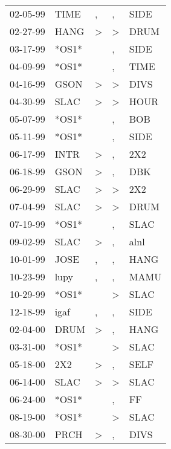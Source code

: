 \begin{supertabular}{lllll}
 02-05-99 &   TIME &                , &             , &   SIDE \\
 02-27-99 &   HANG &     \textgreater &  \textgreater &   DRUM \\
 03-17-99 &  *OS1* &                  &             , &   SIDE \\
 04-09-99 &  *OS1* &                  &             , &   TIME \\
 04-16-99 &   GSON &     \textgreater &  \textgreater &   DIVS \\
 04-30-99 &   SLAC &     \textgreater &  \textgreater &   HOUR \\
 05-07-99 &  *OS1* &                  &             , &    BOB \\
 05-11-99 &  *OS1* &                  &             , &   SIDE \\
 06-17-99 &   INTR &     \textgreater &             , &    2X2 \\
 06-18-99 &   GSON &     \textgreater &             , &    DBK \\
 06-29-99 &   SLAC &     \textgreater &  \textgreater &    2X2 \\
 07-04-99 &   SLAC &     \textgreater &  \textgreater &   DRUM \\
 07-19-99 &  *OS1* &                  &             , &   SLAC \\
 09-02-99 &   SLAC &     \textgreater &             , &   alnl \\
 10-01-99 &   JOSE &                , &             , &   HANG \\
 10-23-99 &   lupy &                , &             , &   MAMU \\
 10-29-99 &  *OS1* &                  &  \textgreater &   SLAC \\
 12-18-99 &   igaf &                , &             , &   SIDE \\
 02-04-00 &   DRUM &     \textgreater &             , &   HANG \\
 03-31-00 &  *OS1* &                  &  \textgreater &   SLAC \\
 05-18-00 &    2X2 &     \textgreater &             , &   SELF \\
 06-14-00 &   SLAC &     \textgreater &  \textgreater &   SLAC \\
 06-24-00 &  *OS1* &                  &             , &     FF \\
 08-19-00 &  *OS1* &                  &  \textgreater &   SLAC \\
 08-30-00 &   PRCH &     \textgreater &             , &   DIVS \\

\end{supertabular}
